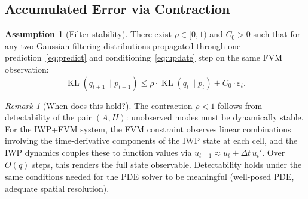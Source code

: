 \documentclass{article}
\theoremstyle{plain}
\theoremstyle{definition}
\newtheorem{assumption}[theorem]{Assumption}
\theoremstyle{remark}
\newtheorem{remark}[theorem]{Remark}
\DeclareMathOperator{\KL}{KL}
\begin{document}
\subsection{Accumulated Error via Contraction}
\label{app:mm-contraction}

\begin{assumption}[Filter stability]
\label{ass:stability}
There exist $\rho \in [0,1)$ and $C_0 > 0$ such that for any two Gaussian filtering distributions propagated through one prediction~\eqref{eq:predict} and conditioning~\eqref{eq:update} step on the same FVM observation:
\begin{equation}\label{eq:contraction}
\KL(q_{t+1} \| p_{t+1}) \leq \rho \cdot \KL(q_t \| p_t) + C_0 \cdot \varepsilon_t.
\end{equation}
\end{assumption}

\begin{remark}[When does this hold?]
The contraction $\rho < 1$ follows from detectability of the pair $(A, H)$: unobserved modes must be dynamically stable. For the IWP+FVM system, the FVM constraint observes linear combinations involving the time-derivative components of the IWP state at each cell, and the IWP dynamics couples these to function values via $u_{t+1} \approx u_t + \Delta t\, u_t'$. Over $O(q)$ steps, this renders the full state observable. Detectability holds under the same conditions needed for the PDE solver to be meaningful (well-posed PDE, adequate spatial resolution).
\end{remark}
\end{document}
